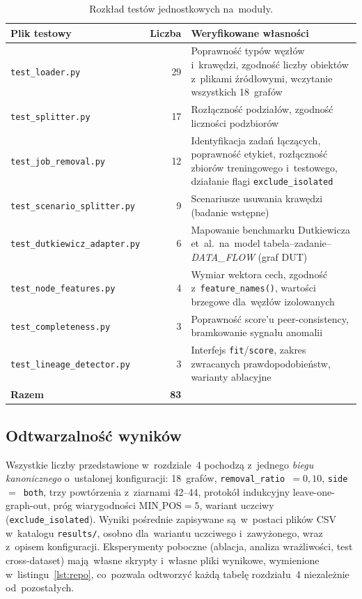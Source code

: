 \begin{table}[ht]
\centering
\caption{Rozkład testów jednostkowych na~moduły.}
\label{tab:testy}
\small
\begin{tabular}{lr>{\raggedright\arraybackslash}p{7.2cm}}
\toprule
\textbf{Plik testowy} & \textbf{Liczba} & \textbf{Weryfikowane własności} \\
\midrule
\texttt{test\_loader.py} & 29 &
  Poprawność typów węzłów i~krawędzi, zgodność liczby obiektów z~plikami
  źródłowymi, wczytanie wszystkich 18~grafów \\
\texttt{test\_splitter.py} & 17 &
  Rozłączność podziałów, zgodność liczności podzbiorów \\
\texttt{test\_job\_removal.py} & 12 &
  Identyfikacja zadań łączących, poprawność etykiet, rozłączność zbiorów
  treningowego i~testowego, działanie flagi \texttt{exclude\_isolated} \\
\texttt{test\_scenario\_splitter.py} & 9 &
  Scenariusze usuwania krawędzi (badanie wstępne) \\
\texttt{test\_dutkiewicz\_adapter.py} & 6 &
  Mapowanie benchmarku Dutkiewicza et~al.\ na~model
  tabela–zadanie–\emph{DATA\_FLOW} (graf DUT) \\
\texttt{test\_node\_features.py} & 4 &
  Wymiar wektora cech, zgodność z~\texttt{feature\_names()},
  wartości brzegowe dla~węzłów izolowanych \\
\texttt{test\_completeness.py} & 3 &
  Poprawność score'u peer-consistency, bramkowanie sygnału anomalii \\
\texttt{test\_lineage\_detector.py} & 3 &
  Interfejs \texttt{fit}/\texttt{score}, zakres zwracanych
  prawdopodobieństw, warianty ablacyjne \\
\midrule
\textbf{Razem} & \textbf{83} & \\
\bottomrule
\end{tabular}
\end{table}

\subsection{Odtwarzalność wyników}

Wszystkie liczby przedstawione w~rozdziale~4 pochodzą z~jednego
\emph{biegu kanonicznego} o~ustalonej konfiguracji: 18~grafów,
\texttt{removal\_ratio}~$=0{,}10$, \texttt{side}~$=$~\texttt{both},
trzy powtórzenia z~ziarnami 42--44, protokół indukcyjny leave-one-graph-out,
próg wiarygodności $\mathrm{MIN\_POS} = 5$, wariant uczciwy
(\texttt{exclude\_isolated}). Wyniki pośrednie zapisywane są~w~postaci plików
CSV w~katalogu \texttt{results/}, osobno dla~wariantu uczciwego
i~zawyżonego, wraz z~opisem konfiguracji. Eksperymenty poboczne
(ablacja, analiza wrażliwości, test cross-dataset) mają~własne skrypty
i~własne pliki wynikowe, wymienione w~listingu~\ref{lst:repo}, co~pozwala
odtworzyć każdą tabelę rozdziału~4 niezależnie od~pozostałych.

